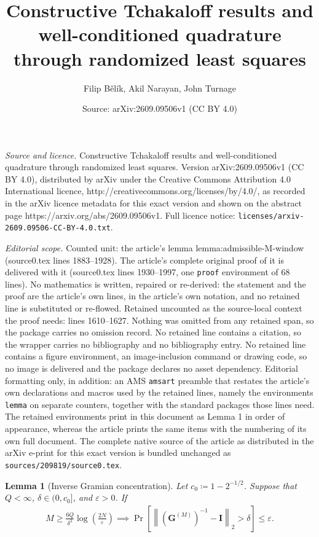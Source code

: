 \documentclass[10pt,a4paper]{amsart}
\title{Constructive Tchakaloff results and well-conditioned quadrature through randomized least squares}
\author{Filip B\v{e}l\'{i}k, Akil Narayan, John Turnage}
\date{Source: arXiv:2609.09506v1 (CC BY 4.0)}
\newtheorem{lemma}{Lemma}
\DeclareMathOperator{\Prob}{Pr}
\newcommand{\mbf}[1]{\mathbf{#1}}
\begin{document}
\maketitle

\noindent\emph{Source and licence.} Constructive Tchakaloff results and well-conditioned quadrature through randomized least squares. Version arXiv:2609.09506v1 (CC BY 4.0), distributed by arXiv under the Creative Commons Attribution 4.0 International licence, http://creativecommons.org/licenses/by/4.0/, as recorded in the arXiv licence metadata for this exact version and shown on the abstract page https://arxiv.org/abs/2609.09506v1. Full licence notice: \texttt{licenses/arxiv-2609.09506-CC-BY-4.0.txt}.\par\smallskip

\noindent\textit{Editorial scope.} Counted unit: the article's lemma lemma:admissible-M-window (source0.tex lines 1883--1928). The article's complete original proof of it is delivered with it (source0.tex lines 1930--1997, one \texttt{proof} environment of 68 lines). No mathematics is written, repaired or re-derived: the statement and the proof are the article's own lines, in the article's own notation, and no retained line is substituted or re-flowed.  Retained uncounted as the source-local context the proof needs: lines 1610--1627.  Nothing was omitted from any retained span, so the package carries no omission record.  No retained line contains a citation, so the wrapper carries no bibliography and no bibliography entry.  No retained line contains a figure environment, an image-inclusion command or drawing code, so no image is delivered and the package declares no asset dependency.  Editorial formatting only, in addition: an AMS \texttt{amsart} preamble that restates the article's own declarations and macros used by the retained lines, namely the environments \texttt{lemma} on separate counters, together with the standard packages those lines need.  The retained environments print in this document as Lemma 1 in order of appearance, whereas the article prints the same items with the numbering of its own full document.  The complete native source of the article as distributed in the arXiv e-print for this exact version is bundled unchanged as \texttt{sources/209819/source0.tex}.
\begin{lemma}[Inverse Gramian concentration]
\label{lemma:F-chernoff}
    Let \(c_0 \coloneqq 1 - 2^{-1/2}\). Suppose that \(Q < \infty\), \(\delta\in(0,c_0]\), and \(\varepsilon>0\). If
    \begin{align}
        \label{eq:Fhat-sampling-criterion}
        M
        \ge
        \frac{6Q}{\delta^2}
        \log\left(\frac{2N}{\varepsilon}\right)
        \implies
        \Prob\left[
            \left\|
            \left(\mbf G^{(M)}\right)^{-1}-\mbf I
            \right\|_2>\delta
        \right]
        \leq \varepsilon .
    \end{align}
\end{lemma}
\end{document}
